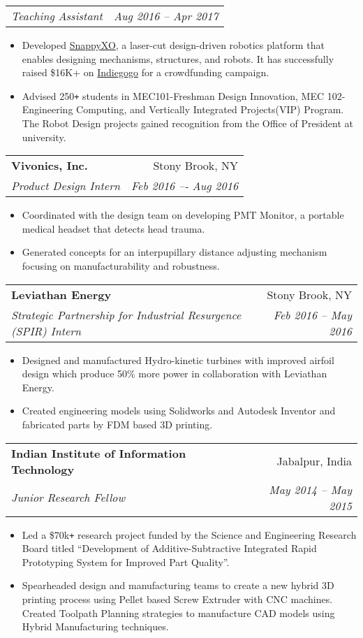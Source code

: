 \documentclass[letterpaper,10pt]{article}
\makeatletter
\newcommand{\resumeHeading}[4]{
  \vspace{-1pt}
    \begin{tabular*}{0.97\textwidth}{l@{\extracolsep{\fill}}r}
      \textbf{#1} & #2 \vspace{-2pt}\\ \vspace{1pt}
      \textit{\small#3} & \textit{\small #4} \\
    \end{tabular*}
}
\newcommand{\resumeSubheadingWithDate}[2]{
    \begin{tabular*}{0.97\textwidth}{l@{\extracolsep{\fill}}r}
      \textit{\small#1} & \textit{\small #2}\\
    \end{tabular*}
    \vspace{+2pt}
}
\newcommand{\resumeItemListStart}{
\vspace{-7pt}
\begin{itemize}[leftmargin=14pt]
}
\newcommand{\resumeItemListEnd}{
\vspace{+7pt}
\end{itemize}
}
\newcommand{\resumeItem}[1]{
  \item\small{
      {#1 \vspace{-7pt}
      }
  }
}
\makeatother
\begin{document}
    \vspace{-5pt}
    \resumeSubheadingWithDate{Teaching Assistant}{Aug 2016 -- Apr 2017}
    \resumeItemListStart
    \resumeItem{Developed \href{http://snappyxo.com/}{SnappyXO}, a laser-cut design-driven robotics platform that enables designing mechanisms, structures, and robots. It has successfully raised \$16K+ on \href{https://www.indiegogo.com/projects/snappyxo-a-design-driven-robotics-education-kit}{Indiegogo} for a crowdfunding campaign.}
    \resumeItem{Advised 250\texttt{+} students in MEC101-Freshman Design Innovation, MEC 102-Engineering Computing, and Vertically Integrated Projects(VIP) Program. The Robot Design projects gained recognition from the Office of President at university.}
    \resumeItemListEnd
    
    \vspace{-4pt}
    \resumeHeading
    {Vivonics, Inc.}{Stony Brook, NY}
    {Product Design Intern}{Feb 2016 –- Aug 2016}
    \resumeItemListStart
    \resumeItem{Coordinated with the design team on developing PMT Monitor, a portable medical headset that detects head trauma.}
    \resumeItem{Generated concepts for an interpupillary distance adjusting mechanism focusing on manufacturability and robustness.}
    \resumeItemListEnd
    
    \vspace{-4pt}
    \resumeHeading
    {Leviathan Energy}{Stony Brook, NY}
    {Strategic Partnership for Industrial Resurgence (SPIR) Intern}{Feb 2016 – May 2016}
    \resumeItemListStart
    \resumeItem{Designed and manufactured Hydro-kinetic turbines with improved airfoil design which produce 50\% more power in collaboration with Leviathan Energy.}
    \resumeItem{Created engineering models using Solidworks and Autodesk Inventor and fabricated parts by FDM based 3D printing.}
    \resumeItemListEnd
    
    \vspace{-4pt}
    \resumeHeading
    {Indian Institute of Information Technology}{Jabalpur, India}
    {Junior Research Fellow}{May 2014 -- May 2015}
    \resumeItemListStart
    \resumeItem{Led a \$70k\texttt{+} research project funded by the Science and Engineering Research Board titled “Development of Additive-Subtractive Integrated Rapid Prototyping System for Improved Part Quality”.}
    \resumeItem{Spearheaded design and manufacturing teams to create a new hybrid 3D printing process using Pellet based Screw Extruder with CNC machines. Created Toolpath Planning strategies to manufacture CAD models using Hybrid Manufacturing techniques.}
    \resumeItemListEnd
\end{document}
